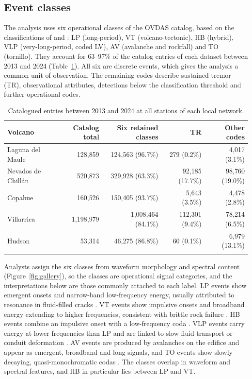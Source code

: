 \documentclass[pdflatex,sn-mathphys-num]{sn-jnl}
\begin{document}
\subsection{Event classes}\label{subsec:classes}

The analysis uses six operational classes of the OVDAS catalog, based on
the classifications of \cite{lahr_earthquake_1994} and
\cite{chouet_volcano_2003}: LP (long-period), VT (volcano-tectonic), HB
(hybrid), VLP (very-long-period, coded LV), AV (avalanche and rockfall) and
TO (tornillo). They account for 63--97\% of the catalog entries of each
dataset between 2013 and 2024 (Table~\ref{tab:rawcounts}). All six are
discrete events, which gives the analysis a common unit of observation. The
remaining codes describe sustained tremor (TR), observational attributes,
detections below the classification threshold and further operational
codes.

\begin{table}[h]
\caption{Catalogued entries between 2013 and 2024 at all stations of each
local network.}\label{tab:rawcounts}
\begin{tabular}{@{}lrrrr@{}}
\toprule
Volcano & Catalog total & Six retained classes & TR & Other codes \\
\midrule
Laguna del Maule
& 128{,}859
& 124{,}563 (96.7\%)
& 279 (0.2\%)
& 4{,}017 (3.1\%) \\
Nevados de Chill\'an
& 520{,}873
& 329{,}928 (63.3\%)
& 92{,}185 (17.7\%)
& 98{,}760 (19.0\%) \\
Copahue
& 160{,}526
& 150{,}405 (93.7\%)
& 5{,}643 (3.5\%)
& 4{,}478 (2.8\%) \\
Villarrica
& 1{,}198{,}979
& 1{,}008{,}464 (84.1\%)
& 112{,}301 (9.4\%)
& 78{,}214 (6.5\%) \\
Hudson
& 53{,}314
& 46{,}275 (86.8\%)
& 60 (0.1\%)
& 6{,}979 (13.1\%) \\
\botrule
\end{tabular}
\end{table}

Analysts assign the six classes from waveform morphology and spectral
content (Figure~\ref{fig:gallery}), so the classes are operational signal
categories, and the interpretations below are those commonly attached to
each label. LP events show emergent onsets and narrow-band low-frequency
energy, usually attributed to resonance in fluid-filled cracks
\cite{chouet_long-period_1996}. VT events show impulsive onsets and
broadband energy extending to higher frequencies, consistent with brittle
rock failure \cite{white_volcano-tectonic_2016}. HB events combine an
impulsive onset with a low-frequency coda
\cite{lahr_earthquake_1994,harrington_volcanic_2007}. VLP events carry
energy at lower frequencies than LP and are linked to slow fluid transport
or conduit deformation \cite{almendros_identifying_2002}. AV events are
produced by avalanches on the edifice \cite{ferreira_deep_2023} and appear
as emergent, broadband and long signals, and TO events show slowly
decaying, quasi-monochromatic codas \cite{gomez_m_tornillo_1999}. The classes overlap in waveform and spectral
features, and HB in particular lies between LP and VT.
\end{document}
